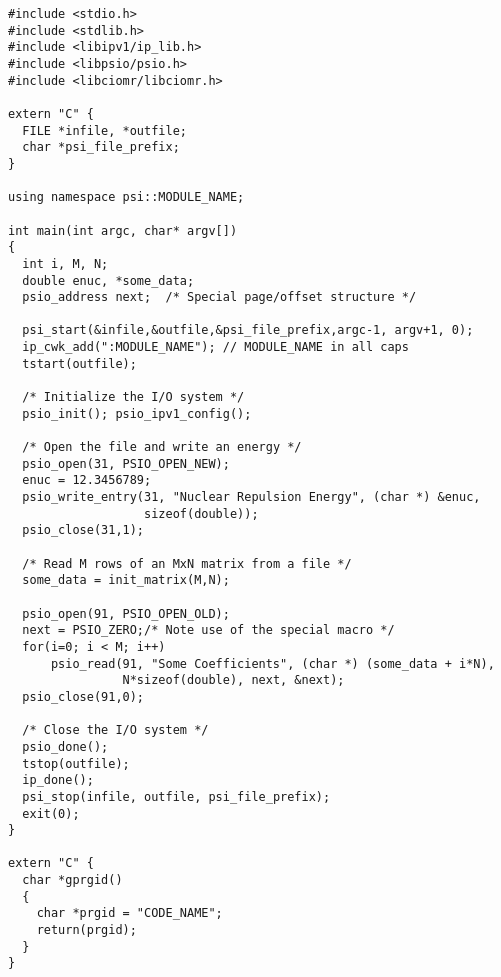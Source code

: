 \begin{verbatim}
#include <stdio.h>
#include <stdlib.h>
#include <libipv1/ip_lib.h>
#include <libpsio/psio.h>
#include <libciomr/libciomr.h>

extern "C" {
  FILE *infile, *outfile;
  char *psi_file_prefix;
}

using namespace psi::MODULE_NAME;

int main(int argc, char* argv[])
{
  int i, M, N;
  double enuc, *some_data;
  psio_address next;  /* Special page/offset structure */

  psi_start(&infile,&outfile,&psi_file_prefix,argc-1, argv+1, 0);
  ip_cwk_add(":MODULE_NAME"); // MODULE_NAME in all caps
  tstart(outfile);

  /* Initialize the I/O system */
  psio_init(); psio_ipv1_config();

  /* Open the file and write an energy */
  psio_open(31, PSIO_OPEN_NEW);
  enuc = 12.3456789;
  psio_write_entry(31, "Nuclear Repulsion Energy", (char *) &enuc,
                   sizeof(double));
  psio_close(31,1);

  /* Read M rows of an MxN matrix from a file */
  some_data = init_matrix(M,N);

  psio_open(91, PSIO_OPEN_OLD);
  next = PSIO_ZERO;/* Note use of the special macro */
  for(i=0; i < M; i++)
      psio_read(91, "Some Coefficients", (char *) (some_data + i*N),
                N*sizeof(double), next, &next);
  psio_close(91,0);

  /* Close the I/O system */
  psio_done();
  tstop(outfile);
  ip_done();
  psi_stop(infile, outfile, psi_file_prefix);
  exit(0);
}

extern "C" {
  char *gprgid()
  {
    char *prgid = "CODE_NAME";
    return(prgid);
  }
}

\end{verbatim}

